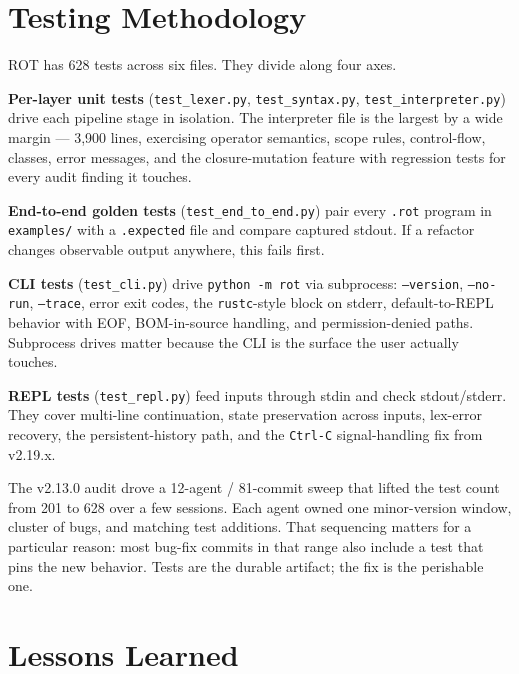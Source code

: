 \documentclass[11pt]{article}
\begin{document}
\section{Testing Methodology}

ROT has 628 tests across six files. They divide along four axes.

\textbf{Per-layer unit tests} (\texttt{test\_lexer.py}, \texttt{test\_syntax.py}, \texttt{test\_interpreter.py}) drive each pipeline stage in isolation. The interpreter file is the largest by a wide margin --- 3{,}900 lines, exercising operator semantics, scope rules, control-flow, classes, error messages, and the closure-mutation feature with regression tests for every audit finding it touches.

\textbf{End-to-end golden tests} (\texttt{test\_end\_to\_end.py}) pair every \texttt{.rot} program in \texttt{examples/} with a \texttt{.expected} file and compare captured stdout. If a refactor changes observable output anywhere, this fails first.

\textbf{CLI tests} (\texttt{test\_cli.py}) drive \texttt{python -m rot} via subprocess: \texttt{--version}, \texttt{--no-run}, \texttt{--trace}, error exit codes, the \texttt{rustc}-style block on stderr, default-to-REPL behavior with EOF, BOM-in-source handling, and permission-denied paths. Subprocess drives matter because the CLI is the surface the user actually touches.

\textbf{REPL tests} (\texttt{test\_repl.py}) feed inputs through stdin and check stdout/stderr. They cover multi-line continuation, state preservation across inputs, lex-error recovery, the persistent-history path, and the \texttt{Ctrl-C} signal-handling fix from v2.19.x.

The v2.13.0 audit drove a 12-agent / 81-commit sweep that lifted the test count from 201 to 628 over a few sessions. Each agent owned one minor-version window, cluster of bugs, and matching test additions. That sequencing matters for a particular reason: most bug-fix commits in that range also include a test that pins the new behavior. Tests are the durable artifact; the fix is the perishable one.

\section{Lessons Learned}
\end{document}

